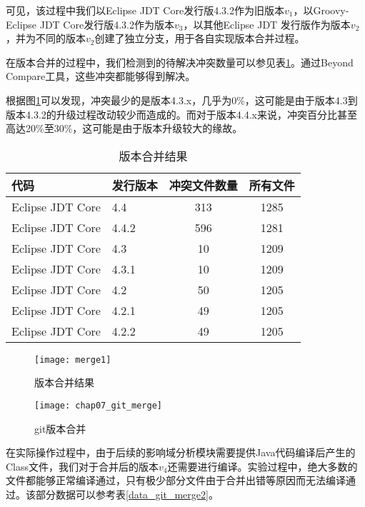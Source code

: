 可见，该过程中我们以Eclipse JDT Core发行版4.3.2作为旧版本$v_1$，以Groovy-Eclipse JDT Core发行版4.3.2作为版本$v_3$，以其他Eclipse JDT 发行版作为版本$v_2$，并为不同的版本$v_2$创建了独立分支，用于各自实现版本合并过程。


在版本合并的过程中，我们检测到的待解决冲突数量可以参见表\ref {data_git_merge}。通过Beyond Compare工具，这些冲突都能够得到解决。

根据图\ref {data_merge}可以发现，冲突最少的是版本4.3.x，几乎为0\%，这可能是由于版本4.3到版本4.3.2的升级过程改动较少而造成的。而对于版本4.4.x来说，冲突百分比甚至高达20\%至30\%，这可能是由于版本升级较大的缘故。

\begin{table}
	\caption{版本合并结果}
	\label{data_git_merge}
	\centering
	\begin{tabular}{llcc}
		\toprule[1.5pt]
		{\heiti 代码} & {\heiti 发行版本} & {\heiti 冲突文件数量} & {\heiti 所有文件}\\\midrule[1pt]
		Eclipse JDT Core & 4.4 & 313 & 1285\\
		Eclipse JDT Core & 4.4.2 & 596 & 1281\\
		Eclipse JDT Core & 4.3 & 10 & 1209\\
		Eclipse JDT Core & 4.3.1 & 10 & 1209\\
		Eclipse JDT Core & 4.2 & 50 & 1205\\
		Eclipse JDT Core & 4.2.1 & 49 & 1205\\
		Eclipse JDT Core & 4.2.2 & 49 & 1205\\
		\bottomrule[1.5pt]
	\end{tabular}
\end{table}

\begin{figure}[H]
	\centering
	\texttt{[image: merge1]}
	\caption {版本合并结果}
	\label {data_merge}	
\end{figure}


\begin{figure}[H]
	\centering
	\texttt{[image: chap07\_git\_merge]}
	\caption {git版本合并}
	\label {exp_git_merge}	
\end{figure}

在实际操作过程中，由于后续的影响域分析模块需要提供Java代码编译后产生的Class文件，我们对于合并后的版本$v_4$还需要进行编译。实验过程中，绝大多数的文件都能够正常编译通过，只有极少部分文件由于合并出错等原因而无法编译通过。该部分数据可以参考表\ref {data_git_merge2}。

